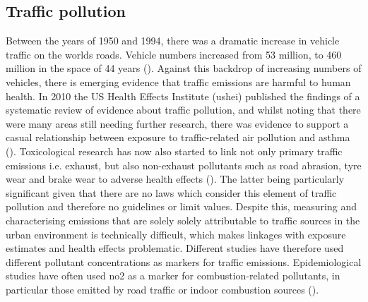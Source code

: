 
\subsection{Traffic pollution}
\label{subsec:trafficpollution}

Between the years of 1950 and 1994, there was a dramatic increase in vehicle traffic on the worlds roads. Vehicle numbers increased from 53 million, to 460 million in the space of 44 years (\cite{TheWorldBank2013}). Against this backdrop of increasing numbers of vehicles, there is emerging evidence that traffic emissions are harmful to human health. In 2010 the US Health Effects Institute (\gls{ushei}) published the findings of a systematic review of evidence about traffic pollution, and whilst noting that there were many areas still needing further research, there was evidence to support a casual relationship between exposure to traffic-related air pollution and asthma (\cite{HPotHEoT-RA2010}). Toxicological research has now also started to link not only primary traffic emissions i.e. exhaust, but also non-exhaust pollutants such as road abrasion, tyre wear and brake wear to adverse health effects (\cite{WorldHealthOrganization2013}). The latter being particularly significant given that there are no laws which consider this element of traffic pollution and therefore no guidelines or limit values. Despite this, measuring and characterising emissions that are solely solely attributable to traffic sources in the urban environment is technically difficult, which makes linkages with exposure estimates and health effects problematic. Different studies have therefore used different pollutant concentrations as markers for traffic emissions. Epidemiological studies have often used \gls{no2} as a marker for combustion-related pollutants, in particular those emitted by road traffic or indoor combustion sources (\cite{WorldHealthOrganization2010}).

